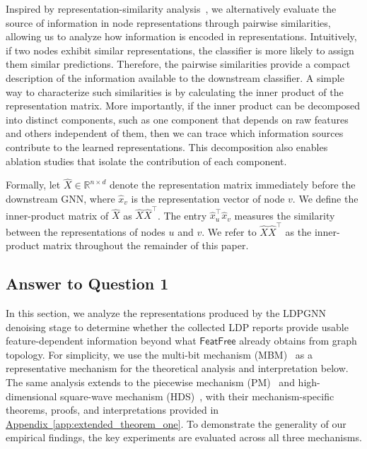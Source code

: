 \documentclass[conference,compsoc]{IEEEtran}
\theoremstyle{boldplain}
\theoremstyle{bolddefinition}
\theoremstyle{remark}
\newcommand{\appref}[1]{\hyperref[#1]{Appendix~\ref*{#1}}}
\newcommand{\ff}{\ensuremath{\mathsf{FeatFree}}\xspace}
\newcommand{\ldpgnn}{LDPGNN\xspace}
\newcommand{\mbmm}{MBM\xspace}
\newcommand{\pmm}{PM\xspace}
\newcommand{\hdsm}{HDS\xspace}
\begin{document}
Inspired by representation-similarity analysis~\cite{kriegeskorte2008rsa,raghu2017svcca,morcos2018insights,kornblith2019similarity,ding2021grounding,cui2022deconfounded}, we alternatively evaluate the source of information in node representations through pairwise similarities, allowing us to analyze how information is encoded in representations.
Intuitively, if two nodes exhibit similar representations, the classifier is more likely to assign them similar predictions. 
Therefore, the pairwise similarities provide a compact description of the information available to the downstream classifier.
A simple way to characterize such similarities is by calculating the inner product of the representation matrix. 
More importantly, if the inner product can be decomposed into distinct components, such as one component that depends on raw features and others independent of them, then we can trace which information sources contribute to the learned representations.
This decomposition also enables ablation studies that isolate the contribution of each component.

Formally, let $\widehat X\in\mathbb{R}^{n\times d}$ denote the representation matrix immediately before the downstream GNN, where $\widehat x_v$ is the representation vector of node $v$. 
We define the inner-product matrix of $\widehat X$ as $\widehat X \widehat X^\top$. 
The entry $\widehat x_u^\top \widehat x_v$ measures the similarity between the representations of nodes $u$ and $v$. 
We refer to  $\widehat X \widehat X^\top$ as the inner-product matrix throughout the remainder of this paper.


\subsection{Answer to Question 1}
\label{subsec:ans_1}


In this section, we analyze the representations produced by the \ldpgnn denoising stage to determine whether the collected LDP reports provide usable feature-dependent information beyond what \ff already obtains from graph topology. 
\textcolor{purple!80}{
For simplicity, we use the multi-bit mechanism (\mbmm)~\cite{lpgNN} as a representative mechanism for the theoretical analysis and interpretation below.
The same analysis extends to the piecewise mechanism (\pmm)~\cite{wang2019ldpmultidim} and high-dimensional square-wave mechanism (\hdsm)~\cite{privge}, with their mechanism-specific theorems, proofs, and interpretations provided in \appref{app:extended_theorem_one}.
To demonstrate the generality of our empirical findings, the key experiments are evaluated across all three mechanisms.
}
\end{document}
